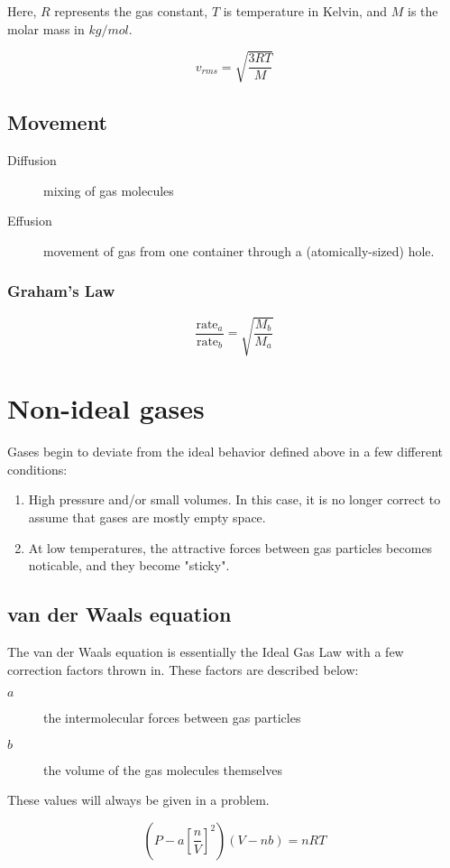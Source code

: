 Here, $R$ represents the gas constant, $T$ is temperature in Kelvin, and $M$ is
the molar mass in $kg/mol$.

\begin{equation}
  v_{rms} = \sqrt{\frac{3RT}{M}}
\end{equation}

\subsection{Movement}
\begin{description}
  \item[Diffusion] mixing of gas molecules
  \item[Effusion] movement of gas from one container through a
    (atomically-sized) hole.
\end{description}

\subsubsection{Graham's Law}
\begin{equation}
  \frac{\text{rate}_a}{\text{rate}_b} = \sqrt{\frac{M_b}{M_a}}
\end{equation}

\section{Non-ideal gases}
Gases begin to deviate from the ideal behavior defined above in a few different
conditions:

\begin{enumerate}
  \item High pressure and/or small volumes. In this case, it is no longer
    correct to assume that gases are mostly empty space.
  \item At low temperatures, the attractive forces between gas particles becomes
    noticable, and they become "sticky".
\end{enumerate}

\subsection{van der Waals equation}
The van der Waals equation is essentially the Ideal Gas Law with a few
correction factors thrown in. These factors are described below:

\begin{description}
  \item[$a$] the intermolecular forces between gas particles
  \item[$b$] the volume of the gas molecules themselves
\end{description}

These values will always be given in a problem.

\begin{equation}
  \left(P-a\left[\frac{n}{V}\right]^2\right)\left(V-nb\right) = nRT
\end{equation}
